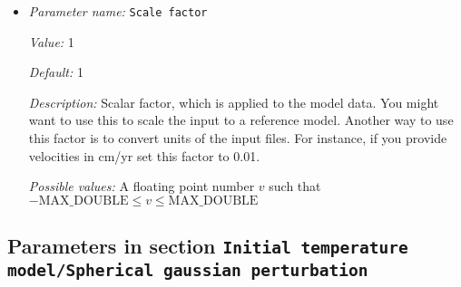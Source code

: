 \begin{itemize}
{\it Possible values:} Any string
\item {\it Parameter name:} {\tt Scale factor}
\label{parameters:Initial temperature model/SAVANI perturbation/Ascii data vs to density model/Scale factor}
\label{parameters:Initial_20temperature_20model/SAVANI_20perturbation/Ascii_20data_20vs_20to_20density_20model/Scale_20factor}


{\it Value:} 1


{\it Default:} 1


{\it Description:} Scalar factor, which is applied to the model data. You might want to use this to scale the input to a reference model. Another way to use this factor is to convert units of the input files. For instance, if you provide velocities in cm/yr set this factor to 0.01.


{\it Possible values:} A floating point number $v$ such that $-\text{MAX\_DOUBLE} \leq v \leq \text{MAX\_DOUBLE}$
\end{itemize}

\subsection{Parameters in section \tt Initial temperature model/Spherical gaussian perturbation}
\label{parameters:Initial_20temperature_20model/Spherical_20gaussian_20perturbation}

